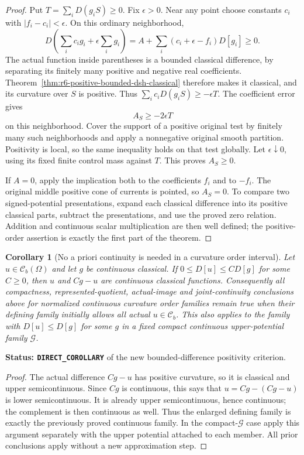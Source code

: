 \documentclass[11pt,a4paper]{article}
\numberwithin{equation}{section}
\newtheorem{corollary}[theorem]{Corollary}
\theoremstyle{definition}
\theoremstyle{remark}
\begin{document}
\begin{proof}
Put $T=\sum_iD(g_iS)\ge0$. Fix $\epsilon>0$. Near any point choose
constants $c_i$ with $|f_i-c_i|<\epsilon$. On this ordinary neighborhood,
\[
 D\left(\sum_i c_i g_i+\epsilon\sum_i g_i\right)
       =A+\sum_i(c_i+\epsilon-f_i)D[g_i]\ge0.
\]
The actual function inside parentheses is a bounded classical
difference, by separating its finitely many positive and negative
real coefficients. Theorem~\ref{thm:r6-positive-bounded-dsh-classical}
therefore makes it classical, and its curvature over $S$ is positive.
Thus $\sum_i c_iD(g_iS)\ge-\epsilon T$. The coefficient error gives
\[
                A_S\ge-2\epsilon T
\]
on this neighborhood. Cover the support of a positive original test
by finitely many such neighborhoods and apply a nonnegative original
smooth partition. Positivity is local, so the same inequality holds
on that test globally. Let $\epsilon\downarrow0$, using its fixed
finite control mass against $T$. This proves $A_S\ge0$.

If $A=0$, apply the implication both to the coefficients $f_i$ and
to $-f_i$. The original middle positive cone of currents is pointed,
so $A_S=0$. To compare two signed-potential presentations, expand each
classical difference into its positive classical parts, subtract the
presentations, and use the proved zero relation. Addition and continuous
scalar multiplication are then well defined; the positive-order
assertion is exactly the first part of the theorem.
\end{proof}

\begin{corollary}[No a priori continuity is needed in a curvature order interval]
\label{cor:r6-continuity-from-continuous-curvature-domination}
Let $u\in\mathcal C_b(\Omega)$ and let $g$ be continuous classical.
If $0\le D[u]\le C D[g]$ for some $C\ge0$, then $u$ and $Cg-u$
are continuous classical functions. Consequently all compactness,
represented-quotient, actual-image and joint-continuity conclusions
above for normalized continuous curvature order families remain true
when their defining family initially allows all actual $u\in\mathcal C_b$.
This also applies to the family with $D[u]\le D[g]$ for some
$g$ in a fixed compact continuous upper-potential family $\mathscr G$.
\end{corollary}

\noindent\textbf{Status: \texttt{DIRECT\_COROLLARY}} of the
new bounded-difference positivity criterion.

\begin{proof}
The actual difference $Cg-u$ has positive curvature, so it is classical
and upper semicontinuous. Since $Cg$ is continuous, this says that
$u=Cg-(Cg-u)$ is lower semicontinuous. It is already upper
semicontinuous, hence continuous; the complement is then continuous
as well. Thus the enlarged defining family is exactly the previously
proved continuous family. In the compact-$\mathscr G$ case apply
this argument separately with the upper potential attached to each
member. All prior conclusions apply without a new approximation step.
\end{proof}
\end{document}

